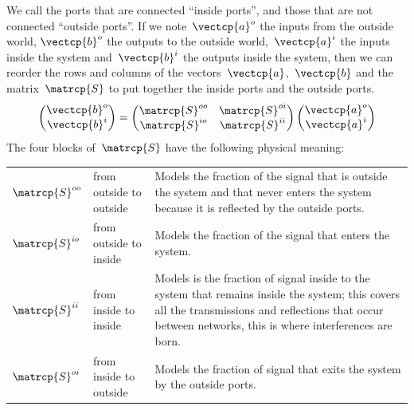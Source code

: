 We call the ports that are connected ``inside ports'', and those that are not connected ``outside ports''.
If we note~$\vectcp{a}^o$ the inputs from the outside world,
$\vectcp{b}^o$ the outputs to the outside world,~$\vectcp{a}^i$ the inputs inside the system and~$\vectcp{b}^i$ the outputs inside the system, then we can reorder the rows and columns of the vectors~$\vectcp{a}$,~$\vectcp{b}$ and the matrix~$\matrcp{S}$ to put together the inside ports and the outside ports.
\begin{equation}
    \begin{pmatrix}
        \vectcp{b}^o\\
        \vectcp{b}^i
    \end{pmatrix}
    =
    \begin{pmatrix}
        \matrcp{S}^{oo} & \matrcp{S}^{oi} \\
        \matrcp{S}^{io} & \matrcp{S}^{ii} \\
    \end{pmatrix}
    \begin{pmatrix}
        \vectcp{a}^o\\
        \vectcp{a}^i
    \end{pmatrix}
    \label{eq:s_outside_inside}
\end{equation}
The four blocks of~$\matrcp{S}$ have the following physical meaning:
\begin{table}[H]
    \centering
    \begin{tabularx}{\textwidth}{l l X}
        $\matrcp{S}^{oo}$ & from outside to outside &
        Models the fraction of the signal that is outside the system and that never enters the system because it is reflected by the outside ports.
        \\
        $\matrcp{S}^{io}$ & from outside to inside &
        Models the fraction of the signal that enters the system.
        \\
        $\matrcp{S}^{ii}$ & from inside to inside &
        Models is the fraction of signal inside to the system that remains inside the system; this covers all the transmissions and reflections that occur between networks, this is where interferences are born.
        \\
        $\matrcp{S}^{oi}$ & from inside to outside &
        Models the fraction of signal that exits the system by the outside ports.
        \\
    \end{tabularx}
\end{table}

